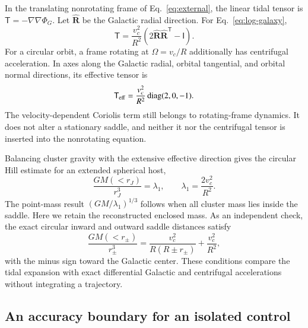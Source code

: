 \documentclass[aps,prd,reprint,amsmath,amssymb,superscriptaddress,nofootinbib,longbibliography,floatfix]{revtex4-2}
\begin{document}
In the translating nonrotating frame of Eq.~\eqref{eq:external}, the linear tidal tensor is $\mathsf T=-\nabla\nabla\Phi_G$. Let $\widehat{\mathbf R}$ be the Galactic radial direction. For Eq.~\eqref{eq:log-galaxy},
\begin{equation}
\mathsf T=\frac{v_c^2}{R^2}
\left(2\widehat{\mathbf R}\widehat{\mathbf R}^{\mathsf T}-\mathsf I\right).
\label{eq:log-tidal-tensor}
\end{equation}
For a circular orbit, a frame rotating at $\Omega=v_c/R$ additionally has centrifugal acceleration. In axes along the Galactic radial, orbital tangential, and orbital normal directions, its effective tensor is
\begin{equation}
\mathsf T_{\rm eff}=\frac{v_c^2}{R^2}\operatorname{diag}(2,0,-1).
\label{eq:effective-tidal-tensor}
\end{equation}
The velocity-dependent Coriolis term still belongs to rotating-frame dynamics. It does not alter a stationary saddle, and neither it nor the centrifugal tensor is inserted into the nonrotating equation.

Balancing cluster gravity with the extensive effective direction gives the circular Hill estimate for an extended spherical host,
\begin{equation}
\frac{G M(<r_J)}{r_J^3}=\lambda_1,
\qquad \lambda_1=\frac{2v_c^2}{R^2}.
\label{eq:extended-jacobi}
\end{equation}
The point-mass result $(GM/\lambda_1)^{1/3}$ follows when all cluster mass lies inside the saddle. Here we retain the reconstructed enclosed mass. As an independent check, the exact circular inward and outward saddle distances satisfy
\begin{equation}
\frac{G M(<r_\pm)}{r_\pm^3}
=\frac{v_c^2}{R(R\pm r_\pm)}+\frac{v_c^2}{R^2},
\label{eq:exact-log-saddles}
\end{equation}
with the minus sign toward the Galactic center. These conditions compare the tidal expansion with exact differential Galactic and centrifugal accelerations without integrating a trajectory.

\subsection{An accuracy boundary for an isolated control}
\end{document}
